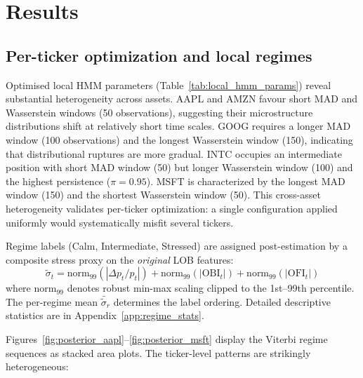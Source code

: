 \documentclass{article}
\begin{document}
\section{Results}
\label{sec:results}

\subsection{Per-ticker optimization and local regimes}

Optimised local HMM parameters (Table~\ref{tab:local_hmm_params}) reveal
substantial heterogeneity across assets. AAPL and AMZN favour short MAD and
Wasserstein windows (50 observations), suggesting their microstructure
distributions shift at relatively short time scales. GOOG requires a longer MAD
window (100 observations) and the longest Wasserstein window (150), indicating
that distributional ruptures are more gradual. INTC occupies an intermediate
position with short MAD window (50) but longer Wasserstein window (100) and the
highest persistence ($\pi = 0.95$). MSFT is characterized by the longest MAD
window (150) and the shortest Wasserstein window (50). This cross-asset
heterogeneity validates per-ticker optimization: a single configuration applied
uniformly would systematically misfit several tickers.

Regime labels (Calm, Intermediate, Stressed) are assigned post-estimation by a
composite stress proxy on the \textit{original} LOB features:
\begin{equation}
\widetilde{\sigma}_t = \text{norm}_{99}\!\left(|\Delta p_t / p_t|\right) +
\text{norm}_{99}\!\left(|\text{OBI}_t|\right) +
\text{norm}_{99}\!\left(|\text{OFI}_t|\right)
\label{eq:stress_proxy}
\end{equation}
where $\text{norm}_{99}$ denotes robust min-max scaling clipped to the
1st--99th percentile. The per-regime mean $\bar{\widetilde{\sigma}}_r$
determines the label ordering. Detailed descriptive statistics are in
Appendix~\ref{app:regime_stats}.

Figures~\ref{fig:posterior_aapl}--\ref{fig:posterior_msft} display the Viterbi
regime sequences as stacked area plots. The ticker-level patterns are strikingly
heterogeneous:
\end{document}
